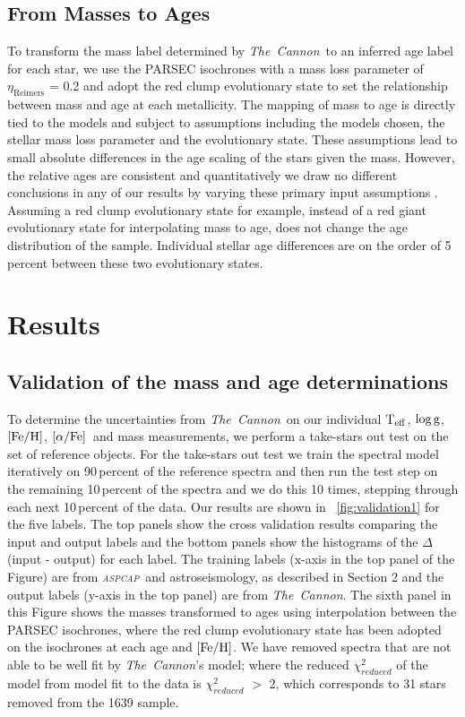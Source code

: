 \documentclass[12pt, preprint]{aastex}
\newcommand{\project}[1]{\textsl{#1}}
\newcommand{\tc}{\project{The~Cannon}}
\newcommand{\aspcap}{\project{\textsc{aspcap}}}
\newcommand{\teff}{\mbox{$\rm T_{eff}$}}
\newcommand{\feh}{\mbox{$\rm [Fe/H]$}}
\newcommand{\alphafe}{\mbox{$\rm [\alpha/Fe]$}}
\newcommand{\logg}{\mbox{$\rm \log g$}}
\begin{document}
\subsection{From Masses to Ages}

To transform the mass label determined by \tc\ to an inferred age label for each star, we use the PARSEC isochrones with a mass loss parameter of $\eta_{\mbox{Reimers}}$ = 0.2 and adopt the red clump evolutionary state to set the relationship between mass and age at each metallicity.  The mapping of mass to age is directly tied to the models and subject to assumptions including the models chosen, the stellar mass loss parameter and the evolutionary state. These assumptions lead to small absolute differences in the age scaling of the stars given the mass. However,  the relative ages are consistent and quantitatively we draw no different conclusions in any of our results by varying these primary input assumptions \citep[see also][]{Bovy2014}. Assuming a red clump evolutionary state for example, instead of a red giant evolutionary state for interpolating mass to age, does not change the age distribution of the sample. Individual stellar age differences are on the order of 5\,percent between these two evolutionary states. 

\section{Results}

\subsection{Validation of the mass and age determinations}

To determine the uncertainties from \tc\ on our individual \teff, \logg, \feh, \alphafe\ and mass measurements, we perform a take-stars out test on the set of reference objects.
For the take-stars out test we train the spectral model iteratively on 90\,percent of the reference spectra and then run the test step on the remaining 10\,percent of the spectra and we do this 10 times, stepping through each next 10\,percent of the data. Our results are shown in \figurename~\ref{fig:validation1} for the five labels. The top panels show the cross validation results comparing the input and output labels and the bottom panels show the histograms of the $\Delta$(input - output) for each label. The training labels (x-axis in the top panel of the Figure) are from \aspcap\ and astroseismology, as described in Section 2 and the output labels (y-axis in the top panel) are from \tc.  The sixth panel in this Figure shows the masses transformed to ages using interpolation between the PARSEC isochrones, where the red clump evolutionary state has been adopted on the isochrones at each age and \feh. We have removed spectra that are not able to be well fit by \tc's model; where the reduced $\chi_{reduced}^2$ of the model from model fit to the data is $\chi_{reduced}^2$ $>$ 2, which corresponds to 31 stars removed from the 1639 sample.
\end{document}

